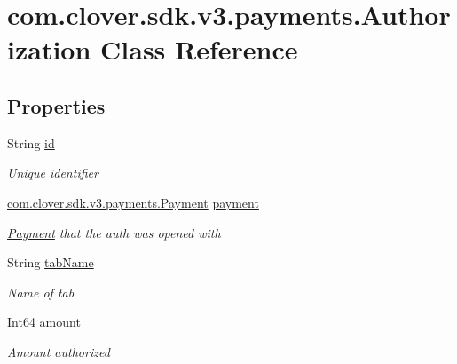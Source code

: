 \hypertarget{classcom_1_1clover_1_1sdk_1_1v3_1_1payments_1_1_authorization}{}\section{com.\+clover.\+sdk.\+v3.\+payments.\+Authorization Class Reference}
\label{classcom_1_1clover_1_1sdk_1_1v3_1_1payments_1_1_authorization}
\subsection*{Properties}
\begin{DoxyCompactItemize}
\item 
String \hyperlink{classcom_1_1clover_1_1sdk_1_1v3_1_1payments_1_1_authorization_adbf3bb107abe37287a15905e5cdec37d}{id}
\begin{DoxyCompactList}\small\item\em Unique identifier \end{DoxyCompactList}\item 
\hyperlink{classcom_1_1clover_1_1sdk_1_1v3_1_1payments_1_1_payment}{com.\+clover.\+sdk.\+v3.\+payments.\+Payment} \hyperlink{classcom_1_1clover_1_1sdk_1_1v3_1_1payments_1_1_authorization_a4a563a08317a13a4449fb5406cc8236e}{payment}
\begin{DoxyCompactList}\small\item\em \hyperlink{classcom_1_1clover_1_1sdk_1_1v3_1_1payments_1_1_payment}{Payment} that the auth was opened with \end{DoxyCompactList}\item 
String \hyperlink{classcom_1_1clover_1_1sdk_1_1v3_1_1payments_1_1_authorization_a0d0cd48415908380aa905a6a16c2dedc}{tab\+Name}
\begin{DoxyCompactList}\small\item\em Name of tab \end{DoxyCompactList}\item 
Int64 \hyperlink{classcom_1_1clover_1_1sdk_1_1v3_1_1payments_1_1_authorization_a8be0fef9d9c4b854cbc8545086227bf5}{amount}
\begin{DoxyCompactList}\small\item\em Amount authorized \end{DoxyCompactList}\item 

\end{DoxyCompactItemize}
